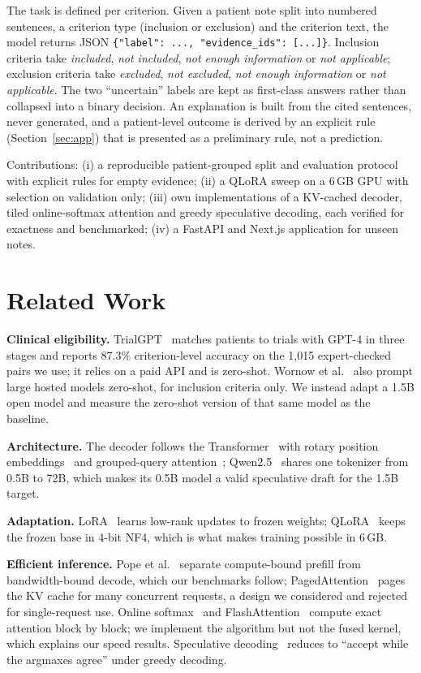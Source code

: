 \documentclass[conference]{IEEEtran}
\newcommand{\code}[1]{\texttt{\small #1}}
\begin{document}
The task is defined per criterion. Given a patient note split into numbered sentences, a criterion type (inclusion or exclusion) and the criterion text, the model returns JSON \code{\{"label": ..., "evidence\_ids": [...]\}}. Inclusion criteria take \emph{included}, \emph{not included}, \emph{not enough information} or \emph{not applicable}; exclusion criteria take \emph{excluded}, \emph{not excluded}, \emph{not enough information} or \emph{not applicable}. The two ``uncertain'' labels are kept as first-class answers rather than collapsed into a binary decision. An explanation is built from the cited sentences, never generated, and a patient-level outcome is derived by an explicit rule (Section~\ref{sec:app}) that is presented as a preliminary rule, not a prediction.

Contributions: (i) a reproducible patient-grouped split and evaluation protocol with explicit rules for empty evidence; (ii) a QLoRA sweep on a 6\,GB GPU with selection on validation only; (iii) own implementations of a KV-cached decoder, tiled online-softmax attention and greedy speculative decoding, each verified for exactness and benchmarked; (iv) a FastAPI and Next.js application for unseen notes.

\section{Related Work}
\textbf{Clinical eligibility.} TrialGPT~\cite{jin2024trialgpt} matches patients to trials with GPT-4 in three stages and reports 87.3\% criterion-level accuracy on the 1,015 expert-checked pairs we use; it relies on a paid API and is zero-shot. Wornow et al.~\cite{wornow2024zeroshot} also prompt large hosted models zero-shot, for inclusion criteria only. We instead adapt a 1.5B open model and measure the zero-shot version of that same model as the baseline.

\textbf{Architecture.} The decoder follows the Transformer~\cite{vaswani2017attention} with rotary position embeddings~\cite{su2021roformer} and grouped-query attention~\cite{ainslie2023gqa}; Qwen2.5~\cite{qwen2025} shares one tokenizer from 0.5B to 72B, which makes its 0.5B model a valid speculative draft for the 1.5B target.

\textbf{Adaptation.} LoRA~\cite{hu2022lora} learns low-rank updates to frozen weights; QLoRA~\cite{dettmers2023qlora} keeps the frozen base in 4-bit NF4, which is what makes training possible in 6\,GB.

\textbf{Efficient inference.} Pope et al.~\cite{pope2023scaling} separate compute-bound prefill from bandwidth-bound decode, which our benchmarks follow; PagedAttention~\cite{kwon2023paged} pages the KV cache for many concurrent requests, a design we considered and rejected for single-request use. Online softmax~\cite{milakov2018online} and FlashAttention~\cite{dao2022flash,dao2024flash2} compute exact attention block by block; we implement the algorithm but not the fused kernel, which explains our speed results. Speculative decoding~\cite{leviathan2023spec,chen2023specsampling} reduces to ``accept while the argmaxes agree'' under greedy decoding.
\end{document}
